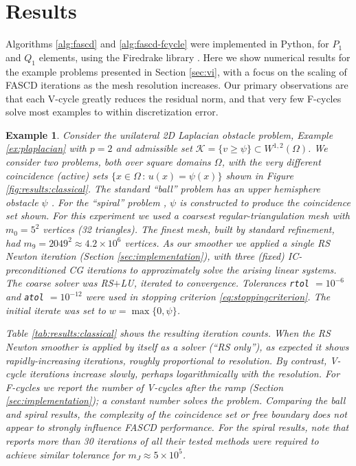 \documentclass[letterpaper,final,12pt,reqno]{amsart}
\theoremstyle{cstyle}
\theoremstyle{cstyle*}
\theoremstyle{dstyle}
\newtheorem{example}[theorem]{Example}
\numberwithin{equation}{section}
\numberwithin{figure}{section}
\numberwithin{table}{section}
\numberwithin{theorem}{section}
\begin{document}
\section{Results} \label{sec:results}

Algorithms \ref{alg:fascd} and \ref{alg:fascd-fcycle} were implemented in Python, for $P_1$ and $Q_1$ elements, using the Firedrake library \cite{Rathgeberetal2016}.  Here we show numerical results for the example problems presented in Section \ref{sec:vi}, with a focus on the scaling of FASCD iterations as the mesh resolution increases.  Our primary observations are that each V-cycle greatly reduces the residual norm, and that very few F-cycles solve most examples to within discretization error.

\begin{example} \label{ex:results:classical}
Consider the unilateral 2D Laplacian obstacle problem, Example \ref{ex:plaplacian} with $p=2$ and admissible set $\mathcal{K} = \{v \ge \psi\} \subset W^{1,2}(\Omega)$.  We consider two problems, both over square domains $\Omega$, with the very different coincidence (active) sets $\{x\in\Omega \,:\, u(x)=\psi(x)\}$ shown in Figure \ref{fig:results:classical}.  The standard ``ball'' problem has an upper hemisphere obstacle $\psi$ \cite[Chapter 12]{Bueler2021}.  For the ``spiral'' problem \cite[problem 7.1.1]{GraeserKornhuber2009}, $\psi$ is constructed to produce the coincidence set shown.  For this experiment we used a coarsest regular-triangulation mesh with $m_0=5^2$ vertices (32 triangles).  The finest mesh, built by standard refinement, had $m_9=2049^2 \approx 4.2 \times 10^{6}$ vertices.  As our smoother we applied a single RS Newton iteration (Section \ref{sec:implementation}), with three (fixed) IC-preconditioned CG iterations to approximately solve the arising linear systems.  The coarse solver was RS$+$LU, iterated to convergence.  Tolerances \texttt{rtol} $= 10^{-6}$ and \texttt{atol} $= 10^{-12}$ were used in stopping criterion \eqref{eq:stoppingcriterion}.  The initial iterate was set to $w=\max\{0,\psi\}$.

Table \ref{tab:results:classical} shows the resulting iteration counts.  When the RS Newton smoother is applied by itself as a solver (``RS only''), as expected it shows rapidly-increasing iterations, roughly proportional to resolution.  By contrast, V-cycle iterations increase slowly, perhaps logarithmically with the resolution.  For F-cycles we report the number of V-cycles after the ramp (Section \ref{sec:implementation}); a constant number solves the problem.  Comparing the ball and spiral results, the complexity of the coincidence set or free boundary does not appear to strongly influence FASCD performance.  For the spiral results, note that \cite{GraeserKornhuber2009} reports more than 30 iterations of all their tested methods were required to achieve similar tolerance for $m_J \approx 5\times 10^5$.


\end{example}
\end{document}
